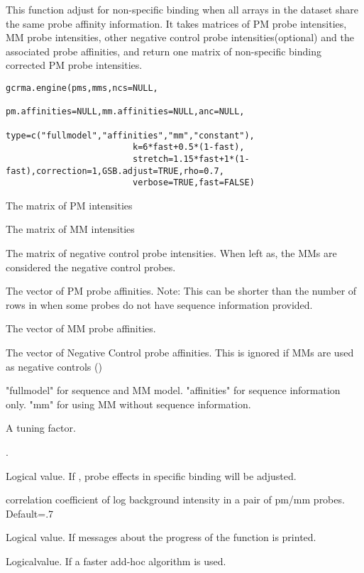 \begin{Description}\relax
This function adjust for non-specific binding when all arrays in the
dataset share the same probe affinity information. It takes matrices of PM
probe intensities, MM probe intensities, other negative control probe
intensities(optional) and the associated probe affinities, and return
one matrix of non-specific binding corrected PM probe intensities.
\end{Description}
\begin{Usage}
\begin{verbatim}
gcrma.engine(pms,mms,ncs=NULL,
                         pm.affinities=NULL,mm.affinities=NULL,anc=NULL,
                         type=c("fullmodel","affinities","mm","constant"),
                         k=6*fast+0.5*(1-fast),
                         stretch=1.15*fast+1*(1-fast),correction=1,GSB.adjust=TRUE,rho=0.7,
                         verbose=TRUE,fast=FALSE)
\end{verbatim}
\end{Usage}
\begin{Arguments}
\begin{ldescription}
\item[\code{pms}] The matrix of PM intensities
\item[\code{mms}] The matrix of MM intensities
\item[\code{ncs}] The matrix of negative control probe intensities. When left
as, the MMs are considered the negative control probes.
\item[\code{pm.affinities}] The vector of PM probe affinities. Note: This can be
shorter than the number of rows in  when some probes do not
have sequence information provided.
\item[\code{mm.affinities}] The vector of MM probe affinities.
\item[\code{anc}] The vector of Negative Control probe affinities. This is
ignored if MMs are used as negative controls ()
\item[\code{type}] "fullmodel" for sequence and MM model. "affinities" for
sequence information only. "mm" for using MM without sequence
information.
\item[\code{k}] A tuning factor.
\item[\code{stretch}] 
\item[\code{correction}] .
\item[\code{GSB.adjust}] Logical value. If , probe effects in specific binding will
be adjusted.
\item[\code{rho}] correlation coefficient of log background intensity in a pair of pm/mm probes. Default=.7
\item[\code{verbose}] Logical value. If  messages about the progress of
the function is printed.
\item[\code{fast}] Logicalvalue. If  a faster add-hoc algorithm is
used.
\end{ldescription}
\end{Arguments}
